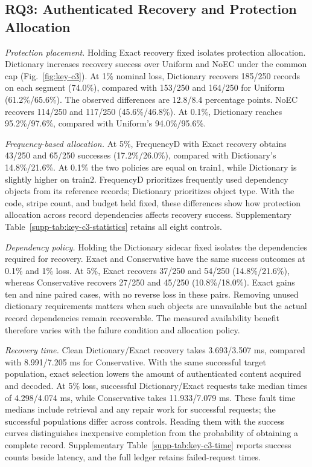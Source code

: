 \documentclass[10pt,journal]{IEEEtran}
\begin{document}
\subsection{RQ3: Authenticated Recovery and Protection Allocation}
\emph{Protection placement.}
Holding Exact recovery fixed isolates protection allocation. Dictionary
increases recovery success over
Uniform and NoEC under the common cap (Fig.~\ref{fig:key-c3}). At 1\%
nominal loss, Dictionary recovers 185/250 records on each segment (74.0\%),
compared with 153/250 and 164/250 for Uniform (61.2\%/65.6\%). The
observed differences are 12.8/8.4 percentage points. NoEC recovers
114/250 and 117/250 (45.6\%/46.8\%). At 0.1\%, Dictionary reaches
95.2\%/97.6\%, compared with Uniform's 94.0\%/95.6\%.

\emph{Frequency-based allocation.}
At 5\%, FrequencyD with Exact recovery obtains 43/250 and 65/250
successes (17.2\%/26.0\%), compared with Dictionary's 14.8\%/21.6\%.
At 0.1\% the two policies are equal on train1, while Dictionary is slightly
higher on train2. FrequencyD prioritizes frequently used dependency objects
from its reference records; Dictionary prioritizes object type. With the code,
stripe count, and budget held fixed, these differences show how protection
allocation across record dependencies affects recovery success.
Supplementary Table~\ref*{supp-tab:key-c3-statistics} retains all eight controls.

\emph{Dependency policy.}
Holding the Dictionary sidecar fixed isolates the dependencies required for
recovery. Exact and Conservative have the same
success outcomes at 0.1\% and 1\% loss. At 5\%, Exact recovers
37/250 and 54/250 (14.8\%/21.6\%), whereas Conservative recovers
27/250 and 45/250 (10.8\%/18.0\%). Exact gains ten and nine paired
cases, with no reverse loss in these pairs. Removing unused dictionary
requirements matters when such objects are unavailable but the actual
record dependencies remain recoverable. The measured availability benefit
therefore varies with the failure condition and allocation policy.

\emph{Recovery time.}
Clean Dictionary/Exact recovery takes 3.693/3.507 ms, compared with
8.991/7.205 ms for Conservative. With the same successful target population,
exact selection lowers the amount of authenticated content acquired and decoded.
At 5\% loss, successful Dictionary/Exact requests take median times of
4.298/4.074 ms, while Conservative takes 11.933/7.079 ms. These fault
time medians include retrieval and any repair work for successful requests;
the successful populations differ across controls. Reading them with the
success curves distinguishes inexpensive completion from the probability
of obtaining a complete record. Supplementary
Table~\ref*{supp-tab:key-c3-time} reports success counts beside latency,
and the full ledger retains failed-request times.
\end{document}
